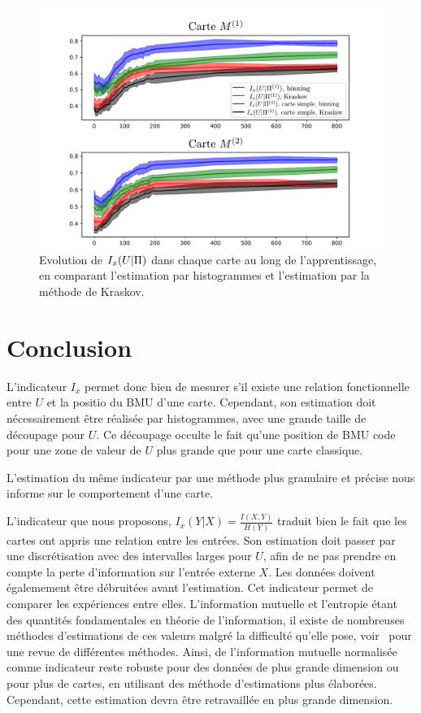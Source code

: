 \begin{figure}
\includegraphics[width=\textwidth]{evolution_MI}
\caption{Evolution de $I_x(U|\Pi)$ dans chaque carte au long de l'apprentissage, en comparant l'estimation par histogrammes et l'estimation par la méthode de Kraskov.}
\label{fig:MI_evol_total}
\end{figure}


\section{Conclusion}
L'indicateur $I_x$ permet donc bien de mesurer s'il existe une relation fonctionnelle entre $U$ et la positio du BMU d'une carte. Cependant, son estimation doit nécessairement être réalisée par histogrammes, avec une grande taille de découpage pour $U$. Ce découpage occulte le fait qu'une position de BMU code pour une zone de valeur de $U$ plus grande que pour une carte classique. 

L'estimation du même indicateur par une méthode plus granulaire et précise nous informe sur le comportement d'une carte.

L'indicateur que nous proposons, $I_x(Y|X) = \frac{I(X,Y)}{H(Y)}$ traduit bien le fait que les cartes ont appris une relation entre les entrées. Son estimation doit passer par une discrétisation avec des intervalles larges pour $U$, afin de ne pas prendre en compte la perte d'information sur l'entrée externe $X$.
Les données doivent égalemement être débruitées avant l'estimation.
Cet indicateur permet de comparer les expériences entre elles.
L'information mutuelle et l'entropie étant des quantités fondamentales en théorie de l'information, il existe de nombreuses méthodes d'estimations de ces valeurs malgré la difficulté qu'elle pose, voir~\cite{Doquire2012ACO} pour une revue de différentes méthodes. Ainsi, de l'information mutuelle normalisée comme indicateur reste robuste pour des données de plus grande dimension ou pour plus de cartes, en utilisant des méthode d'estimations plus élaborées. Cependant, cette estimation devra être retravaillée en plus grande dimension. 

